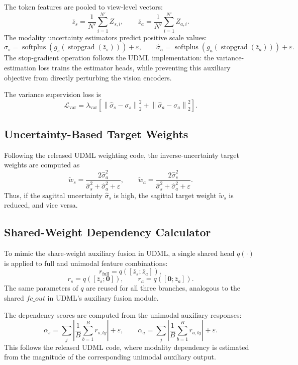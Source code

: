 The token features are pooled to view-level vectors:
\[
    \bar{z}_s = \frac{1}{N'} \sum_{i=1}^{N'} Z_{s,i},
    \qquad
    \bar{z}_a = \frac{1}{N'} \sum_{i=1}^{N'} Z_{a,i}.
\]
The modality uncertainty estimators predict positive scale values:
\[
    \hat{\sigma}_s
    =
    \operatorname{softplus}\left(g_s(\operatorname{stopgrad}(\bar{z}_s))\right)
    + \varepsilon,
    \qquad
    \hat{\sigma}_a
    =
    \operatorname{softplus}\left(g_a(\operatorname{stopgrad}(\bar{z}_a))\right)
    + \varepsilon.
\]
The stop-gradient operation follows the UDML implementation: the variance-estimation loss trains the estimator heads, while preventing this auxiliary objective from directly perturbing the vision encoders.

The variance supervision loss is
\[
    \mathcal{L}_{\text{var}}
    =
    \lambda_{\text{var}}
    \left[
        \left\lVert \hat{\sigma}_s - \sigma_s \right\rVert_2^2
        +
        \left\lVert \hat{\sigma}_a - \sigma_a \right\rVert_2^2
    \right].
\]

\subsection{Uncertainty-Based Target Weights}

Following the released UDML weighting code, the inverse-uncertainty target weights are computed as
\[
    \tilde{w}_s
    =
    \frac{2\hat{\sigma}_a^2}
         {\hat{\sigma}_s^2+\hat{\sigma}_a^2+\varepsilon},
    \qquad
    \tilde{w}_a
    =
    \frac{2\hat{\sigma}_s^2}
         {\hat{\sigma}_s^2+\hat{\sigma}_a^2+\varepsilon}.
\]
Thus, if the sagittal uncertainty \(\hat{\sigma}_s\) is high, the sagittal target weight \(\tilde{w}_s\) is reduced, and vice versa.

\subsection{Shared-Weight Dependency Calculator}

To mimic the share-weight auxiliary fusion in UDML, a single shared head \(q(\cdot)\) is applied to full and unimodal feature combinations:
\[
    r_{\text{full}}
    =
    q([\bar{z}_s;\bar{z}_a]),
\]
\[
    r_s
    =
    q([\bar{z}_s;\mathbf{0}]),
    \qquad
    r_a
    =
    q([\mathbf{0};\bar{z}_a]).
\]
The same parameters of \(q\) are reused for all three branches, analogous to the shared \(fc\_out\) in UDML's auxiliary fusion module.

The dependency scores are computed from the unimodal auxiliary responses:
\[
    \alpha_s
    =
    \sum_j
    \left|
        \frac{1}{B}\sum_{b=1}^{B} r_{s,bj}
    \right|
    + \varepsilon,
    \qquad
    \alpha_a
    =
    \sum_j
    \left|
        \frac{1}{B}\sum_{b=1}^{B} r_{a,bj}
    \right|
    + \varepsilon.
\]
This follows the released UDML code, where modality dependency is estimated from the magnitude of the corresponding unimodal auxiliary output.

